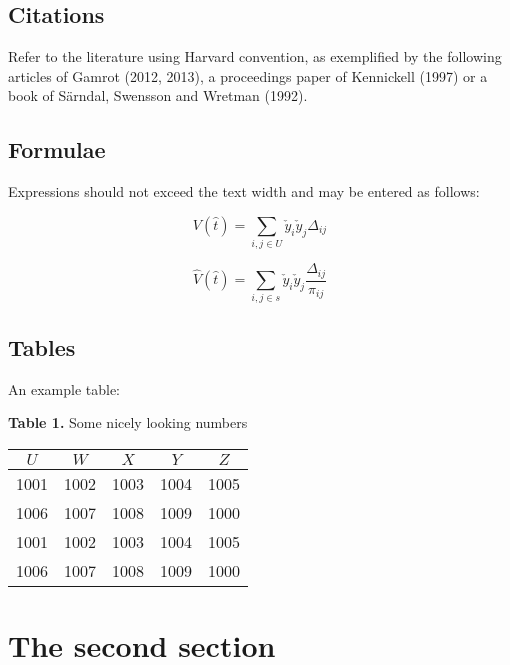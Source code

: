 \documentclass[10pt,twoside]{article}
\begin{document}
\subsection{Citations}

Refer to the literature using Harvard convention, as exemplified by the following articles of Gamrot (2012, 2013), a proceedings paper of Kennickell (1997) or a book of S\"{a}rndal, Swensson and Wretman (1992).

\subsection{Formulae}

Expressions should not exceed the text width and may be entered as follows:

\begin{equation}
V(\hat{t})=\sum_{i,j \in U} \check{y}_i \check{y}_j \Delta_{ij}
\end{equation}

\begin{equation}
\hat{V}(\hat{t})=\sum_{i,j \in s} \check{y}_i \check{y}_j \frac{\Delta_{ij}}{\pi_{ij}}
\end{equation}


\subsection{Tables}

An example table:


\begin{center}
	
	\textbf{Table 1.} Some nicely looking numbers\\\smallskip
\begin{small}
\begin{tabular}{ccccc}\hline
	$U$ & $W$ & $X$ & $Y$ & $Z$ \\\hline
	1001 & 1002 & 1003 & 1004 & 1005 \\
	1006 & 1007 & 1008 & 1009 & 1000 \\
	1001 & 1002 & 1003 & 1004 & 1005 \\
	1006 & 1007 & 1008 & 1009 & 1000 \\\hline	
\end{tabular}
\end{small}

\end{center}	






\section{The second section}
\end{document}
